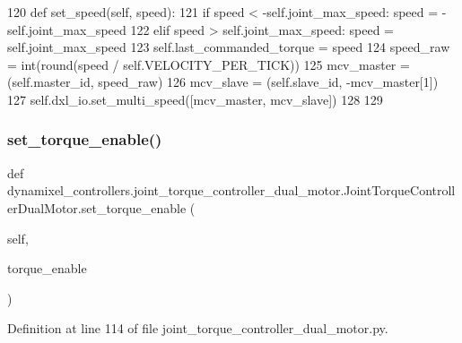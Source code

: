 \begin{DoxyCode}
120     \textcolor{keyword}{def }set\_speed(self, speed):
121         \textcolor{keywordflow}{if} speed < -self.joint\_max\_speed: speed = -self.joint\_max\_speed
122         \textcolor{keywordflow}{elif} speed > self.joint\_max\_speed: speed = self.joint\_max\_speed
123         self.last\_commanded\_torque = speed
124         speed\_raw = int(round(speed / self.VELOCITY\_PER\_TICK))
125         mcv\_master = (self.master\_id, speed\_raw)
126         mcv\_slave = (self.slave\_id, -mcv\_master[1])
127         self.dxl\_io.set\_multi\_speed([mcv\_master, mcv\_slave])
128 
129 
\end{DoxyCode}
\mbox{\label{classdynamixel__controllers_1_1joint__torque__controller__dual__motor_1_1_joint_torque_controller_dual_motor_adb706374f9a3e4a3cddb1ebafde0c15a}} 
\subsubsection{\texorpdfstring{set\+\_\+torque\+\_\+enable()}{set\_torque\_enable()}}
{\footnotesize\ttfamily def dynamixel\+\_\+controllers.\+joint\+\_\+torque\+\_\+controller\+\_\+dual\+\_\+motor.\+Joint\+Torque\+Controller\+Dual\+Motor.\+set\+\_\+torque\+\_\+enable (\begin{DoxyParamCaption}\item[{}]{self,  }\item[{}]{torque\+\_\+enable }\end{DoxyParamCaption})}



Definition at line 114 of file joint\+\_\+torque\+\_\+controller\+\_\+dual\+\_\+motor.\+py.



